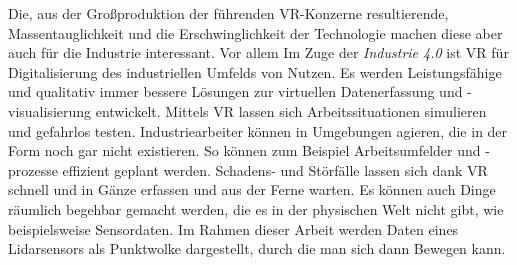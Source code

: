 Die, aus der Großproduktion der führenden VR-Konzerne resultierende, Massentauglichkeit und die Erschwinglichkeit der Technologie machen diese aber auch für die Industrie interessant. Vor allem Im Zuge der \textit{Industrie 4.0} ist VR für Digitalisierung des industriellen Umfelds von Nutzen. Es werden Leistungsfähige und qualitativ immer bessere Lösungen zur virtuellen Datenerfassung und -visualisierung entwickelt. Mittels VR lassen sich Arbeitssituationen simulieren und gefahrlos testen. Industriearbeiter können in Umgebungen agieren, die in der Form noch gar nicht existieren. So können zum Beispiel Arbeitsumfelder und -prozesse effizient geplant werden. Schadens- und Störfälle lassen sich dank VR schnell und in Gänze erfassen und aus der Ferne warten. Es können auch Dinge räumlich begehbar gemacht werden, die es in der physischen Welt nicht gibt, wie beispielsweise Sensordaten. Im Rahmen dieser Arbeit werden Daten eines Lidarsensors als Punktwolke dargestellt, durch die man sich dann Bewegen kann.  




